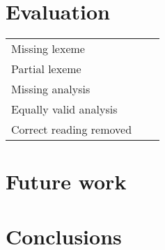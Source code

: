 \documentclass[11pt]{article}
\begin{document}
\section{Evaluation}

\begin{table}
  \begin{tabular}{|l|r|r|}
    \hline
    Missing lexeme & &  \\          %
    Partial lexeme & &  \\          %
    Missing analysis & &  \\        %
    Equally valid analysis & & \\   %
    Correct reading removed & &  \\ %
    \hline
  \end{tabular}

\end{table}



\section{Future work}

\section{Conclusions}


%



\end{document}
